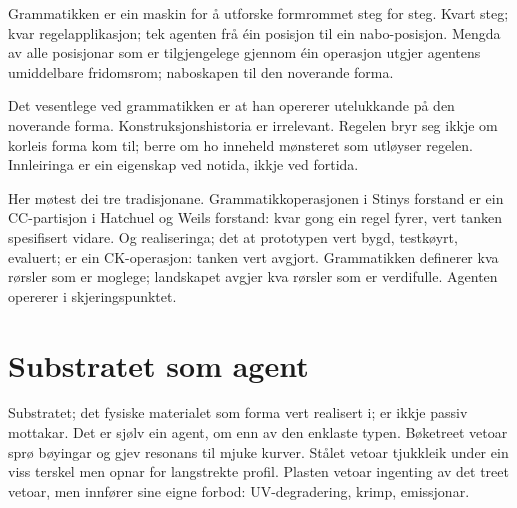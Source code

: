 Grammatikken er ein maskin for å utforske formrommet steg for steg. Kvart steg; kvar regelapplikasjon; tek agenten frå éin posisjon til ein nabo-posisjon. Mengda av alle posisjonar som er tilgjengelege gjennom éin operasjon utgjer agentens umiddelbare fridomsrom; naboskapen til den noverande forma.

Det vesentlege ved grammatikken er at han opererer utelukkande på den noverande forma. Konstruksjonshistoria er irrelevant. Regelen bryr seg ikkje om korleis forma kom til; berre om ho inneheld mønsteret som utløyser regelen. Innleiringa er ein eigenskap ved notida, ikkje ved fortida.


Her møtest dei tre tradisjonane. Grammatikkoperasjonen i Stinys forstand er ein CC-partisjon i Hatchuel og Weils forstand: kvar gong ein regel fyrer, vert tanken spesifisert vidare. Og realiseringa; det at prototypen vert bygd, testkøyrt, evaluert; er ein CK-operasjon: tanken vert avgjort. Grammatikken definerer kva rørsler som er moglege; landskapet avgjer kva rørsler som er verdifulle. Agenten opererer i skjeringspunktet.

\section*{Substratet som agent}



Substratet; det fysiske materialet som forma vert realisert i; er ikkje passiv mottakar. Det er sjølv ein agent, om enn av den enklaste typen. Bøketreet vetoar sprø bøyingar og gjev resonans til mjuke kurver. Stålet vetoar tjukkleik under ein viss terskel men opnar for langstrekte profil. Plasten vetoar ingenting av det treet vetoar, men innfører sine eigne forbod: UV-degradering, krimp, emissjonar.

